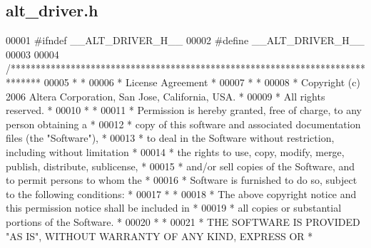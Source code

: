\subsection{alt\+\_\+driver.\+h}
\label{alt__driver_8h_source}

\begin{DoxyCode}
00001 \textcolor{preprocessor}{#ifndef \_\_ALT\_DRIVER\_H\_\_}
00002 \textcolor{preprocessor}{#define \_\_ALT\_DRIVER\_H\_\_}
00003 
00004 \textcolor{comment}{/******************************************************************************}
00005 \textcolor{comment}{*                                                                             *}
00006 \textcolor{comment}{* License Agreement                                                           *}
00007 \textcolor{comment}{*                                                                             *}
00008 \textcolor{comment}{* Copyright (c) 2006 Altera Corporation, San Jose, California, USA.           *}
00009 \textcolor{comment}{* All rights reserved.                                                        *}
00010 \textcolor{comment}{*                                                                             *}
00011 \textcolor{comment}{* Permission is hereby granted, free of charge, to any person obtaining a     *}
00012 \textcolor{comment}{* copy of this software and associated documentation files (the "Software"),  *}
00013 \textcolor{comment}{* to deal in the Software without restriction, including without limitation   *}
00014 \textcolor{comment}{* the rights to use, copy, modify, merge, publish, distribute, sublicense,    *}
00015 \textcolor{comment}{* and/or sell copies of the Software, and to permit persons to whom the       *}
00016 \textcolor{comment}{* Software is furnished to do so, subject to the following conditions:        *}
00017 \textcolor{comment}{*                                                                             *}
00018 \textcolor{comment}{* The above copyright notice and this permission notice shall be included in  *}
00019 \textcolor{comment}{* all copies or substantial portions of the Software.                         *}
00020 \textcolor{comment}{*                                                                             *}
00021 \textcolor{comment}{* THE SOFTWARE IS PROVIDED "AS IS", WITHOUT WARRANTY OF ANY KIND, EXPRESS OR  *}

\end{DoxyCode}
